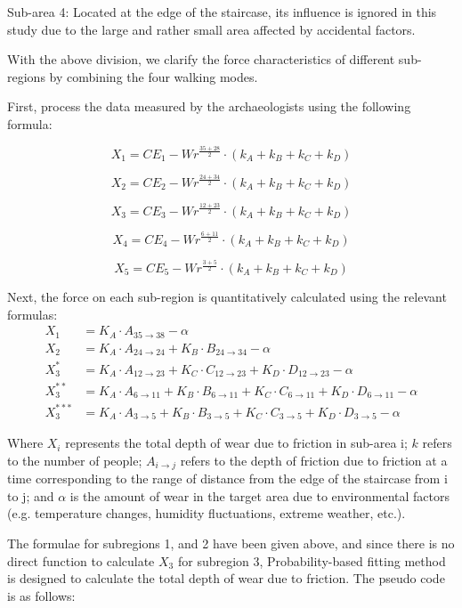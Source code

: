 \documentclass{mcmthesis}
\begin{document}
Sub-area 4: Located at the edge of the staircase, its influence is ignored in this study due to the large and rather small area affected by accidental factors.

With the above division, we clarify the force characteristics of different sub-regions by combining the four walking modes.

First, process the data measured by the archaeologists using the following formula:

\[ X_1 = CE_1 - Wr^{\frac{35 + 28}{2}} \cdot \left(k_A + k_B + k_C + k_D\right) \]

\[ X_2 = CE_2 - Wr^{\frac{24 + 34}{2}} \cdot \left(k_A + k_B + k_C + k_D\right) \]

\[ X_3 = CE_3 - Wr^{\frac{12 + 23}{2}} \cdot \left(k_A + k_B + k_C + k_D\right) \]

\[ X_4 = CE_4 - Wr^{\frac{6 + 11}{2}} \cdot \left(k_A + k_B + k_C + k_D\right) \]

\[ X_5 = CE_5 - Wr^{\frac{3 + 5}{2}} \cdot \left(k_A + k_B + k_C + k_D\right) \]

 Next, the force on each sub-region is quantitatively calculated using the relevant formulas:
 \begin{align}
  X_1 &= K_A \cdot A_{35 \to 38} - \alpha \\
  X_2 &= K_A \cdot A_{24 \to 24} + K_B \cdot B_{24 \to 34} - \alpha \\
  X_3^* &= K_A \cdot A_{12 \to 23} + K_C \cdot C_{12 \to 23} + K_D \cdot D_{12 \to 23} - \alpha \\
  X_3^{**} &= K_A \cdot A_{6 \to 11} + K_B \cdot B_{6 \to 11} + K_C \cdot C_{6 \to 11} + K_D \cdot D_{6 \to 11} - \alpha \\
  X_3^{***} &= K_A \cdot A_{3 \to 5} + K_B \cdot B_{3 \to 5} + K_C \cdot C_{3 \to 5} + K_D \cdot D_{3 \to 5} - \alpha
  \end{align}
  

Where $X_i$ represents the total depth of wear due to friction in sub-area i; $k$ refers to the number of people; $A_{i \to j}$ refers to the depth of friction due to friction at a time corresponding to the range of distance from the edge of the staircase from i to j; and $\alpha$ is the amount of wear in the target area due to environmental factors (e.g. temperature changes, humidity fluctuations, extreme weather, etc.).

The formulae for subregions 1, and 2 have been given above, and since there is no direct function to calculate $X_3$ for subregion 3, Probability-based fitting method is designed to calculate the total depth of wear due to friction. The pseudo code is as follows:
\end{document}
